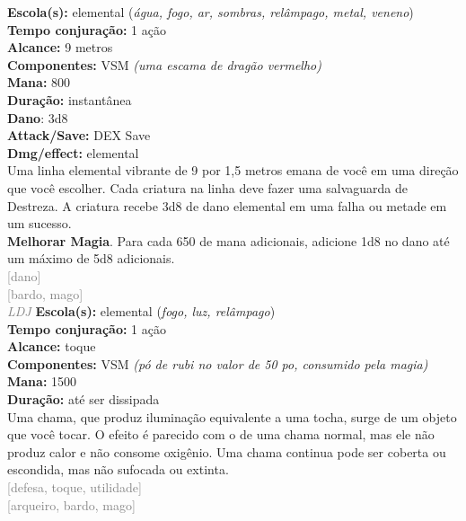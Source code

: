 \documentclass{RPG_Adventure}[2021/10/20]
\begin{document}
{\small \t \textbf{Escola(s):} elemental (\textit{água, fogo, ar, sombras, relâmpago, metal, veneno})\\\t \textbf{Tempo conjuração:} 1 ação\\\t \textbf{Alcance:} 9 metros\\\t \textbf{Componentes:} VSM \textit{(uma escama de dragão vermelho)}\\\t \textbf{Mana:} 800\\\t \textbf{Duração:} instantânea\\\t \textbf{Dano}: 3d8\\\t \textbf{Attack/Save:} DEX Save\\\t \textbf{Dmg/effect:} elemental\\}
{\normalsize Uma linha elemental vibrante de 9 por 1,5 metros emana de você em uma direção que você escolher. Cada criatura na linha deve fazer uma salvaguarda de Destreza. A criatura recebe 3d8 de dano elemental em uma falha ou metade em um sucesso.\\\t \textbf{Melhorar Magia}. Para cada 650 de mana adicionais, adicione 1d8 no dano até um máximo de 5d8 adicionais.\\}
{\scriptsize \textcolor{gray}{[dano]\\}}
{\scriptsize \textcolor{gray}{[bardo, mago]\\}}
{\tiny \textcolor{gray}{\textit{LDJ}}}\jump{}
{\small \t \textbf{Escola(s):} elemental (\textit{fogo, luz, relâmpago})\\\t \textbf{Tempo conjuração:} 1 ação\\\t \textbf{Alcance:} toque\\\t \textbf{Componentes:} VSM \textit{(pó de rubi no valor de 50 po, consumido pela magia)}\\\t \textbf{Mana:} 1500\\\t \textbf{Duração:} até ser dissipada\\}
{\normalsize Uma chama, que produz iluminação equivalente a uma tocha, surge de um objeto que você tocar. O efeito é parecido com o de uma chama normal, mas ele não produz calor e não consome oxigênio. Uma chama continua pode ser coberta ou escondida, mas não sufocada ou extinta.\\}
{\scriptsize \textcolor{gray}{[defesa, toque, utilidade]\\}}
{\scriptsize \textcolor{gray}{[arqueiro, bardo, mago]\\}}
\end{document}
